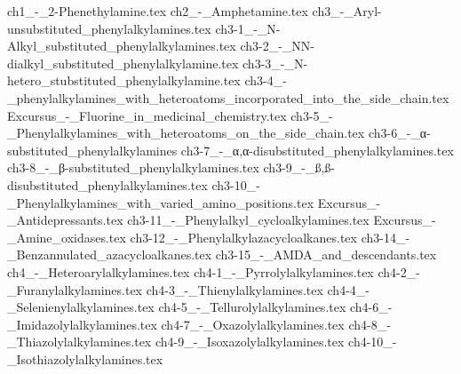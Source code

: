 \documentclass{book}
\newcommand\blankpage{%
	\null
	\thispagestyle{empty}%
	\addtocounter{page}{-1}%
	\newpage}
\begin{document}
	
\frontmatter


\blankpage






\mainmatter
%






%
%
%
%
%
%
%
%
ch1_-_2-Phenethylamine.tex
ch2_-_Amphetamine.tex
ch3_-_Aryl-unsubstituted_phenylalkylamines.tex
ch3-1_-_N-Alkyl_substituted_phenylalkylamines.tex
ch3-2_-_NN-dialkyl_substituted_phenylalkylamine.tex
ch3-3_-_N-hetero_stubstituted_phenylalkylamine.tex
ch3-4_-_phenylalkylamines_with_heteroatoms_incorporated_into_the_side_chain.tex
Excursus_-_Fluorine_in_medicinal_chemistry.tex
ch3-5_-_Phenylalkylamines_with_heteroatoms_on_the_side_chain.tex
ch3-6_-_α-substituted_phenylalkylamines
ch3-7_-_α,α-disubstituted_phenylalkylamines.tex
ch3-8_-_β-substituted_phenylalkylamines.tex
ch3-9_-_ß,ß-disubstituted_phenylalkylamines.tex
ch3-10_-_Phenylalkylamines_with_varied_amino_positions.tex
Excursus_-_Antidepressants.tex
ch3-11_-_Phenylalkyl_cycloalkylamines.tex
Excursus_-_Amine_oxidases.tex
ch3-12_-_Phenylalkylazacycloalkanes.tex
ch3-14_-_Benzannulated_azacycloalkanes.tex
ch3-15_-_AMDA_and_descendants.tex
ch4_-_Heteroarylalkylamines.tex
ch4-1_-_Pyrrolylalkylamines.tex
ch4-2_-_Furanylalkylamines.tex
ch4-3_-_Thienylalkylamines.tex
ch4-4_-_Selenienylalkylamines.tex
ch4-5_-_Tellurolylalkylamines.tex
ch4-6_-_Imidazolylalkylamines.tex
ch4-7_-_Oxazolylalkylamines.tex
ch4-8_-_Thiazolylalkylamines.tex
ch4-9_-_Isoxazolylalkylamines.tex
ch4-10_-_Isothiazolylalkylamines.tex
\end{document}
